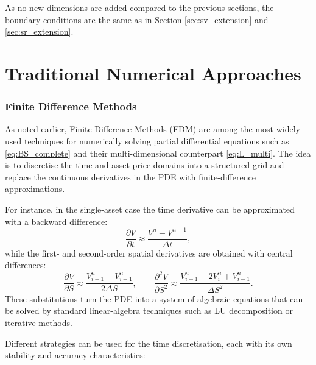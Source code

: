 \documentclass[12pt]{report} %
\theoremstyle{plain} %
\theoremstyle{definition} %
\theoremstyle{remark} %
\begin{document}
As no new dimensions are added compared to the previous sections, the boundary conditions are the same as 
in Section \ref{sec:sv_extension} and \ref{sec:sr_extension}.
\section{Traditional Numerical Approaches}
\subsubsection{Finite Difference Methods}
As noted earlier, Finite Difference Methods (FDM) are among the most widely used
techniques for numerically solving partial differential equations such as
\eqref{eq:BS_complete} and their multi-dimensional counterpart
\eqref{eq:L_multi}. The idea is to discretise the time and asset-price domains
into a structured grid and replace the continuous derivatives in the PDE with
finite-difference approximations.

For instance, in the single-asset case the time derivative can be approximated
with a backward difference:
\[
 \frac{\partial V}{\partial t} \approx \frac{V^{n}-V^{n-1}}{\Delta t},
\]
while the first- and second-order spatial derivatives are obtained with central
differences:
\[
 \frac{\partial V}{\partial S} \approx
 \frac{V_{i+1}^{n}-V_{i-1}^{n}}{2\Delta S},
 \qquad
 \frac{\partial^{2}V}{\partial S^{2}} \approx
 \frac{V_{i+1}^{n}-2V_{i}^{n}+V_{i-1}^{n}}{\Delta S^{2}}.
\]
These substitutions turn the PDE into a system of algebraic equations that can
be solved by standard linear-algebra techniques such as LU decomposition or
iterative methods.

Different strategies can be used for the time discretisation, 
each with its own stability and accuracy characteristics:
\end{document}
